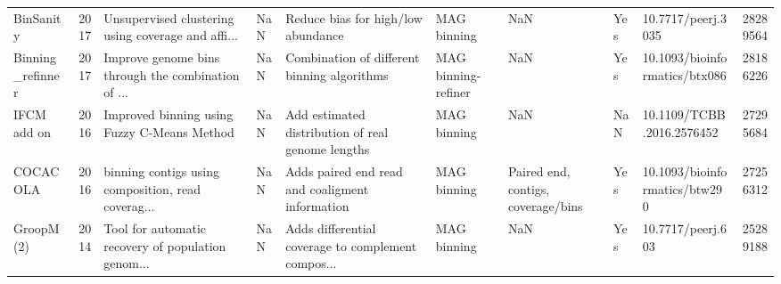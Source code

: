 \begin{tabular}{lrlllllllr}
                 BinSanity &  2017 & Unsupervised clustering using coverage and affi... &            NaN &                Reduce bias for high/low abundance  &                               MAG binning &                                            NaN &                        Yes &             10.7717/peerj.3035 &  28289564 \\
          Binning\_refinner &  2017 & Improve genome bins through the combination of ... &            NaN &        Combination of different binning algorithms &                       MAG binning-refiner &                                            NaN &                        Yes &  10.1093/bioinformatics/btx086 &  28186226 \\
               IFCM add on &  2016 &        Improved binning using Fuzzy C-Means Method &            NaN &  Add estimated distribution of real genome lengths &                               MAG binning &                                            NaN &                        NaN &      10.1109/TCBB.2016.2576452 &  27295684 \\
                  COCACOLA &  2016 & binning contigs using composition, read coverag... &            NaN &    Adds paired end read and coaligment information &                               MAG binning &             Paired end, contigs, coverage/bins &                        Yes &  10.1093/bioinformatics/btw290 &  27256312 \\
                GroopM (2) &  2014 & Tool for automatic recovery of population genom... &            NaN & Adds differential coverage to complement compos... &                               MAG binning &                                            NaN &                        Yes &              10.7717/peerj.603 &  25289188 \\
\bottomrule
\end{tabular}
